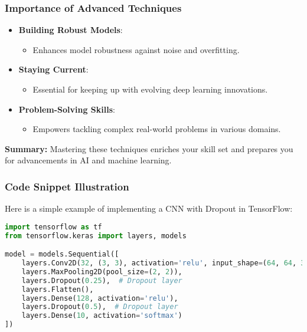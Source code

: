 \documentclass[aspectratio=169]{beamer}
\begin{document}
\begin{frame}[fragile]
    \frametitle{Importance of Advanced Techniques}
    
    \begin{itemize}
        \item \textbf{Building Robust Models}: 
        \begin{itemize}
            \item Enhances model robustness against noise and overfitting.
        \end{itemize}
        
        \item \textbf{Staying Current}: 
        \begin{itemize}
            \item Essential for keeping up with evolving deep learning innovations.
        \end{itemize}
        
        \item \textbf{Problem-Solving Skills}: 
        \begin{itemize}
            \item Empowers tackling complex real-world problems in various domains.
        \end{itemize}
    \end{itemize}
    
    \textbf{Summary:} Mastering these techniques enriches your skill set and prepares you for advancements in AI and machine learning.
\end{frame}

\begin{frame}[fragile]
    \frametitle{Code Snippet Illustration}
    
    Here is a simple example of implementing a CNN with Dropout in TensorFlow:

    \begin{lstlisting}[language=Python]
import tensorflow as tf
from tensorflow.keras import layers, models

model = models.Sequential([
    layers.Conv2D(32, (3, 3), activation='relu', input_shape=(64, 64, 3)),
    layers.MaxPooling2D(pool_size=(2, 2)),
    layers.Dropout(0.25),  # Dropout layer
    layers.Flatten(),
    layers.Dense(128, activation='relu'),
    layers.Dropout(0.5),  # Dropout layer
    layers.Dense(10, activation='softmax')
])
    \end{lstlisting}
\end{frame}
\end{document}
